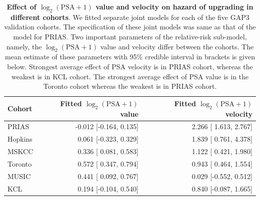 \begin{table}
\small\sf\centering
\caption{\textbf{Effect of $\log_2 (\mbox{PSA} + 1)$ value and velocity on hazard of upgrading in different cohorts}. We fitted separate joint models for each of the five GAP3 validation cohorts. The specification of these joint models was same as that of the model for PRIAS. Two important parameters of the relative-risk sub-model, namely, the $\log_2 (\mbox{PSA} + 1)$ value and velocity differ between the cohorts. The mean estimate of these parameters with 95\% credible interval in brackets is given below. Strongest average effect of PSA velocity is in PRIAS cohort, whereas the weakest is in KCL cohort. The strongest average effect of PSA value is in the Toronto cohort whereas the weakest is in PRIAS cohort.}
\label{tab:PSA_survival_all}
\begin{tabular}{lrr}
\hline
Cohort & Fitted $\log_2 (\mbox{PSA} + 1)$ value & Fitted $\log_2 (\mbox{PSA} + 1)$ velocity\\
\hline
PRIAS & -0.012 [-0.164, 0.135] & 2.266 [ 1.613, 2.767]\\
Hopkins & 0.061 [-0.323, 0.329] & 1.839 [ 0.761, 4.378]\\
MSKCC & 0.336 [ 0.081, 0.583] & 1.122 [ 0.421, 1.980]\\
Toronto & 0.572 [ 0.347, 0.794] & 0.943 [ 0.464, 1.554]\\
MUSIC & 0.441 [ 0.092, 0.767] & 0.029 [-0.552, 0.512]\\
KCL &  0.194 [-0.104, 0.540] & 0.840 [-0.087, 1.665]\\
\hline
\end{tabular}
\end{table}

